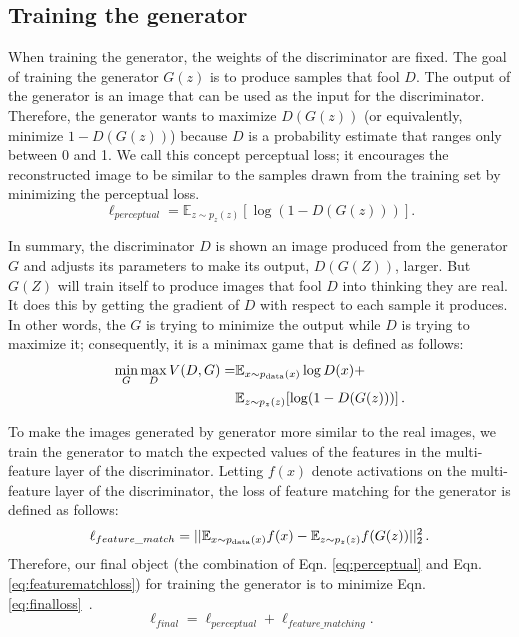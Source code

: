 \documentclass[journal]{IEEEtran}
\begin{document}
\subsection{Training the generator}
When training the generator, the weights of the discriminator are fixed. The goal of training the generator $G(z)$ is to produce samples that fool $D$. The output of the generator is an image that can be used as the input for the discriminator. Therefore, the generator wants to maximize $D(G(z))$ (or equivalently, minimize $1-D(G(z))$) because $D$ is a probability estimate that ranges only between 0 and 1. We call this concept perceptual loss; it encourages the reconstructed image to be similar to the samples drawn from the training set by minimizing the perceptual loss.
\begin{equation}
\ell_{perceptual}={\mathbb E}_{{z}\sim p_z({z})}[\log (1-D(G({z})))].
\label{eq:perceptual}
\end{equation}

In summary, the discriminator $D$ is shown an image produced from the generator $G$ and adjusts its parameters to make its output, $D(G(Z))$, larger. But $G(Z)$ will train itself to produce images that fool $D$ into thinking they are real. It does this by getting the gradient of $D$ with respect to each sample it produces. In other words, the $G$ is trying to minimize the output while $D$ is trying to maximize it; consequently, it is a minimax game that is defined as follows:
\vspace{-1.5mm}
\begin{align}
\min_G \max_D V(D,G)=&{\mathbb E}_{x\sim p_{\rm data}(x)} \log D(x) +\nonumber\\
&{\mathbb E}_{z\sim p_z(z)}[\log (1-D(G(z)))]\,.
\label{eq:minmax}
\end{align}

To make the images generated by generator more similar to the real images, we train the generator to match the expected values of the features in the multi-feature layer of the discriminator. Letting $f(x)$ denote activations on the multi-feature layer of the discriminator, the loss of feature matching for the generator is defined as follows:
\begin{equation}
\ell_{feature\_match}=||{\mathbb E}_{x\sim p_{\rm data}(x)} f(x)-{\mathbb E}_{z\sim p_z(z)}f(G(z))||_2^2 \,.
\label{eq:featurematchloss}
\end{equation}
Therefore, our final object (the combination of Eqn. \ref{eq:perceptual} and Eqn. \ref{eq:featurematchloss}) for training the generator is to minimize Eqn. \ref{eq:finalloss}~. 
\begin{equation}
\ell_{final}=\ell_{perceptual}+ \ell_{feature\_matching}
\label{eq:finalloss}.
\end{equation}
\end{document}
